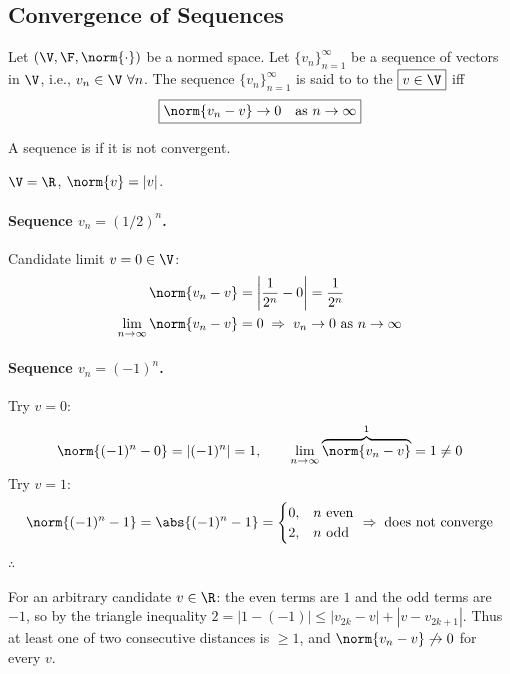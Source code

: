 \subsection{Convergence of Sequences}\label{ss:convergence}
\begin{definition}
Let $(\V,\F,\norm{\cdot})$ be a normed space. Let $\{v_n\}_{n=1}^\infty$ be a sequence of vectors in $\V$, i.e., $v_n\in\V\ \forall n$. The sequence $\{v_n\}_{n=1}^\infty$ is said to  to the  $\boxed{v\in\V}$ iff
\[
\boxed{\norm{v_n - v} \to 0 \quad \text{as } n\to\infty}
\]
\end{definition}
\begin{remark}
A sequence is  if it is not convergent.
\end{remark}
\begin{example}
$\V = \R$, $\norm{v} = |v|$.

\paragraph{Sequence $v_n = (1/2)^n$.} Candidate limit $v = 0 \in \V$:
\begin{align*}
\norm{v_n - v} &= \left|\frac{1}{2^n} - 0\right| = \frac{1}{2^n}\\
\lim_{n\to\infty}\norm{v_n - v} &= 0
\;\Rightarrow\; v_n \to 0 \text{ as } n\to\infty
\end{align*}

\paragraph{Sequence $v_n = (-1)^n$.} Try $v = 0$:
\[
\norm{(-1)^n - 0} = |(-1)^n| = 1, \qquad \lim_{n\to\infty}\overbrace{\norm{v_n - v}}^{1} = 1 \neq 0
\]
Try $v = 1$:
\[
\norm{(-1)^n - 1} = \abs{(-1)^n - 1} = \begin{cases} 0, & n \text{ even}\\ 2, & n \text{ odd}\end{cases} \;\Rightarrow\; \text{does not converge}
\]
$\therefore$ 
\begin{insight}
For an arbitrary candidate $v\in\R$: the even terms are $1$ and the odd terms are $-1$, so by the triangle inequality $2 = |1-(-1)| \le |v_{2k}-v| + |v - v_{2k+1}|$. Thus at least one of two consecutive distances is $\ge 1$, and $\norm{v_n - v}\not\to 0$ for every $v$.
\end{insight}
\end{example}

